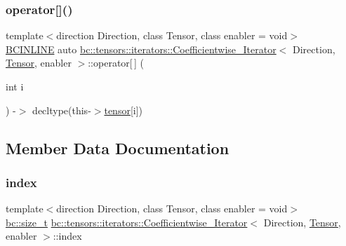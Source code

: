 \subsubsection{\texorpdfstring{operator[]()}{operator[]()}\hspace{0.1cm}{\footnotesize\ttfamily [2/2]}}
{\footnotesize\ttfamily template$<$direction Direction, class Tensor, class enabler = void$>$ \\
\hyperlink{common_8h_a6699e8b0449da5c0fafb878e59c1d4b1}{B\+C\+I\+N\+L\+I\+NE} auto \hyperlink{structbc_1_1tensors_1_1iterators_1_1Coefficientwise__Iterator}{bc\+::tensors\+::iterators\+::\+Coefficientwise\+\_\+\+Iterator}$<$ Direction, \hyperlink{namespacebc_a659391e47ab612be3ba6c18cf9c89159}{Tensor}, enabler $>$\+::operator\mbox{[}$\,$\mbox{]} (\begin{DoxyParamCaption}\item[{int}]{i }\end{DoxyParamCaption}) -\/$>$ decltype(this-\/$>$\hyperlink{structbc_1_1tensors_1_1iterators_1_1Coefficientwise__Iterator_a57cc6a9c7df0597c90d03309e367cbd2}{tensor}\mbox{[}i\mbox{]}) \hspace{0.3cm}{\ttfamily [inline]}}



\subsection{Member Data Documentation}
\mbox{\label{structbc_1_1tensors_1_1iterators_1_1Coefficientwise__Iterator_a746b74f8681813da3829e96e0e9b8273}} 
\subsubsection{\texorpdfstring{index}{index}}
{\footnotesize\ttfamily template$<$direction Direction, class Tensor, class enabler = void$>$ \\
\hyperlink{namespacebc_aaf8e3fbf99b04b1b57c4f80c6f55d3c5}{bc\+::size\+\_\+t} \hyperlink{structbc_1_1tensors_1_1iterators_1_1Coefficientwise__Iterator}{bc\+::tensors\+::iterators\+::\+Coefficientwise\+\_\+\+Iterator}$<$ Direction, \hyperlink{namespacebc_a659391e47ab612be3ba6c18cf9c89159}{Tensor}, enabler $>$\+::index}


